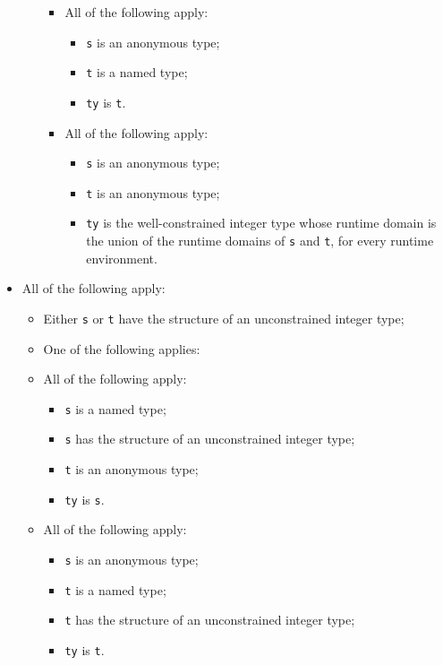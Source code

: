 \documentclass{book}
\begin{document}
\begin{itemize}
\begin{itemize}
\begin{itemize}
      \item All of the following apply:
        \begin{itemize}
        \item \texttt{s} is an anonymous type;
        \item \texttt{t} is a named type;
        \item \texttt{ty} is \texttt{t}.
        \end{itemize}

      \item All of the following apply:
        \begin{itemize}
        \item \texttt{s} is an anonymous type;
        \item \texttt{t} is an anonymous type;
	\item \texttt{ty} is the well-constrained integer type whose runtime domain is the union of the
	  runtime domains of \texttt{s} and \texttt{t}, for every runtime environment.
        \end{itemize}
      \end{itemize}
    \end{itemize}

  \item All of the following apply:
    \begin{itemize}
    \item Either \texttt{s} or \texttt{t} have the structure of an unconstrained integer type;
    \item One of the following applies:

      \item All of the following apply:
        \begin{itemize}
        \item \texttt{s} is a named type;
        \item \texttt{s} has the structure of an unconstrained integer type;
        \item \texttt{t} is an anonymous type;
        \item \texttt{ty} is \texttt{s}.
        \end{itemize}

      \item All of the following apply:
        \begin{itemize}
        \item \texttt{s} is an anonymous type;
        \item \texttt{t} is a named type;
        \item \texttt{t} has the structure of an unconstrained integer type;
        \item \texttt{ty} is \texttt{t}.
        \end{itemize}


\end{itemize}
\end{itemize}
\end{document}
